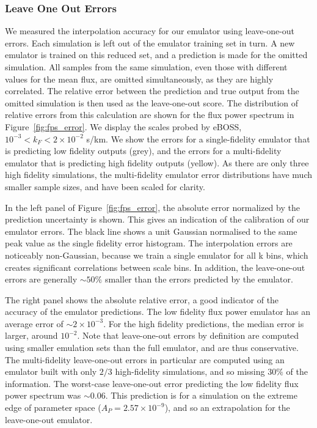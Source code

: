 \documentclass[a4paper,11pt]{article}
\begin{document}

\subsubsection{Leave One Out Errors}
\label{sec:looerror}

We measured the interpolation accuracy for our emulator using leave-one-out errors. Each simulation is left out of the emulator training set in turn. A new emulator is trained on this reduced set, and a prediction is made for the omitted simulation. All samples from the same simulation, even those with different values for the mean flux, are omitted simultaneously, as they are highly correlated. The relative error between the prediction and true output from the omitted simulation is then used as the leave-one-out score.
The distribution of relative errors from this calculation are shown for the flux power spectrum in Figure~\ref{fig:fps_error}. We display the scales probed by eBOSS, $10^{-3} < k_F < 2 \times 10^{-2}$ s/km.
We show the errors for a single-fidelity emulator that is predicting low fidelity outputs (grey), and the errors for a multi-fidelity emulator that is predicting high fidelity outputs (yellow). As there are only three high fidelity simulations, the multi-fidelity emulator error distributions have much smaller sample sizes, and have been scaled for clarity.

In the left panel of Figure~\ref{fig:fps_error}, the absolute error normalized by the prediction uncertainty is shown. This gives an indication of the calibration of our emulator errors. The black line shows a unit Gaussian normalised to the same peak value as the single fidelity error histogram. The interpolation errors are noticeably non-Gaussian, because we train a single emulator for all k bins, which creates significant correlations between scale bins. In addition, the leave-one-out errors are generally $\sim 50\%$ smaller than the errors predicted by the emulator.

The right panel shows the absolute relative error, a good indicator of the accuracy of the emulator predictions.
The low fidelity flux power emulator has an average error of $\sim 2\times 10^{-3}$. For the high fidelity predictions, the median error is larger, around $10^{-2}$. Note that leave-one-out errors by definition are computed using smaller emulation sets than the full emulator, and are thus conservative. The multi-fidelity leave-one-out errors in particular are computed using an emulator built with only $2/3$ high-fidelity simulations, and so missing $30\%$ of the information. The worst-case leave-one-out error predicting the low fidelity flux power spectrum was $\sim 0.06$. This prediction is for a simulation on the extreme edge of parameter space ($A_P = 2.57\times10^{-9}$), and so an extrapolation for the leave-one-out emulator.
\end{document}
